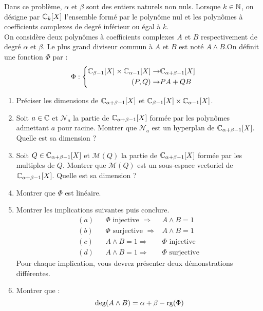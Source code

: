 Dans ce problème, $\alpha$ et $\beta$ sont des entiers naturels non nuls. Lorsque $k\in \mathbb{N}$, on désigne par $\mathbb{C}_k[X]$ l'ensemble formé par le polynôme nul et les polynômes à coefficients complexes de degré inférieur ou égal à $k$.\\
On considère deux polynômes à coefficients complexes $A$ et $B$ respectivement de degré $\alpha$ et $\beta$. Le plus grand diviseur commun à $A$ et $B$ est noté $A\wedge B$.\newline On définit une fonction $\Phi$ par :
\begin{displaymath}
 \Phi : 
\left\lbrace
\begin{aligned}
 \mathbb{C}_{\beta -1}[X] \times \mathbb{C}_{\alpha -1}[X] \rightarrow& \mathbb{C}_{\alpha +\beta -1}[X]\\
(P,Q) \rightarrow& PA + QB
\end{aligned}
 \right. 
\end{displaymath}
\begin{enumerate}
 \item Préciser les dimensions de $\mathbb{C}_{\alpha +\beta -1}[X]$ et $\mathbb{C}_{\beta -1}[X] \times \mathbb{C}_{\alpha -1}[X]$.
\item Soit $a\in \mathbb{C}$ et $\mathcal N_a$ la partie de $\mathbb{C}_{\alpha +\beta -1}[X]$ formée par les polynômes admettant $a$ pour racine.\newline
Montrer que $\mathcal N_a$ est un hyperplan de $\mathbb{C}_{\alpha +\beta -1}[X]$. Quelle est sa dimension ?
\item Soit $Q\in \mathbb{C}_{\alpha +\beta -1}[X]$ et $\mathcal M(Q)$ la partie de $\mathbb{C}_{\alpha +\beta -1}[X]$ formée par les multiples de $Q$.\newline
Montrer que $\mathcal M(Q)$ est un sous-espace vectoriel de $\mathbb{C}_{\alpha +\beta -1}[X]$. Quelle est sa dimension ?
\item Montrer que $\Phi$ est linéaire.
\item Montrer les implications suivantes puis conclure.
\begin{align*}
 (a)& &\Phi \text{ injective } \Rightarrow& A\wedge B = 1 \\
 (b)& &\Phi \text{ surjective } \Rightarrow& A\wedge B = 1 \\
 (c)& &A\wedge B = 1 \Rightarrow&  \Phi \text{ injective }\\
 (d)& &A\wedge B = 1 \Rightarrow&  \Phi \text{ surjective }
\end{align*}
Pour chaque implication, vous devrez présenter deux démonstrations différentes. 
\item Montrer que :
\begin{displaymath}
 \deg(A\wedge B) = \alpha +\beta -\operatorname{rg}(\Phi)
\end{displaymath}

\end{enumerate}
